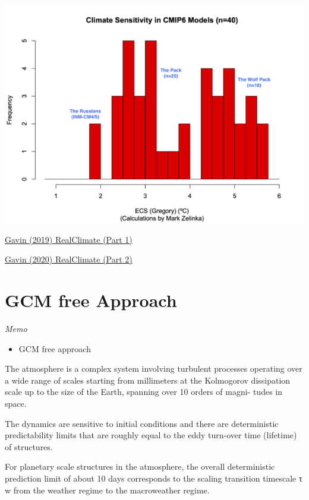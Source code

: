 \documentclass[
]{book}
\providecommand{\tightlist}{%
  \setlength{\itemsep}{0pt}\setlength{\parskip}{0pt}}
\begin{document}
\includegraphics{fig/Gavin_2020_cmip6_ecs.png}

\href{http://www.realclimate.org/index.php/archives/2019/11/sensitive-but-unclassified/}{Gavin (2019) RealClimate (Part 1)}

\href{http://www.realclimate.org/index.php/archives/2020/06/sensitive-but-unclassified-part-ii/}{Gavin (2020) RealClimate (Part 2)}

\hypertarget{gcm-free-approach}{%
\section{GCM free Approach}\label{gcm-free-approach}}

\emph{Memo}

\begin{itemize}
\tightlist
\item
  GCM free approach
\end{itemize}

The atmosphere is a complex system involving turbulent
processes operating over a wide range of scales starting
from millimeters at the Kolmogorov dissipation scale up
to the size of the Earth, spanning over 10 orders of magni-
tudes in space.

The dynamics are sensitive to initial conditions and there are
deterministic predictability limits that
are roughly equal to the eddy turn-over time (lifetime) of
structures.

For planetary scale structures in the atmosphere,
the overall deterministic prediction limit of about 10 days
corresponds to the scaling transition timescale τ w from the
weather regime to the macroweather regime.
\end{document}

